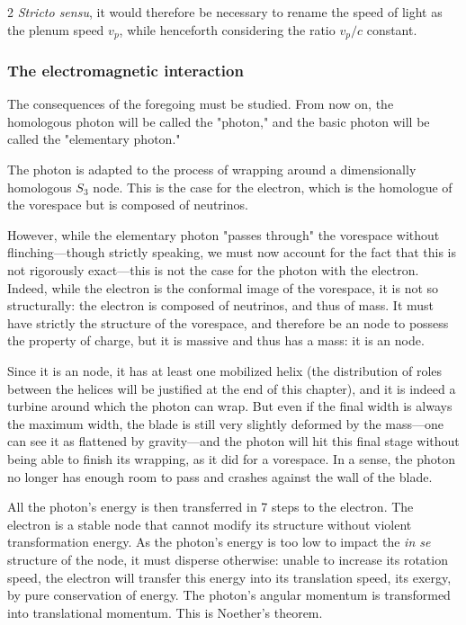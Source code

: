 \begin{multicols}{2}
	\textit{Stricto sensu}, it would therefore be necessary to rename the speed of light as the plenum speed $v_p$, while henceforth considering the ratio $v_p/c$ constant.
	
	\subsubsection{The electromagnetic interaction}
	
	The consequences of the foregoing must be studied. From now on, the homologous photon will be called the "photon," and the basic photon will be called the "elementary photon."
	
	The photon is adapted to the process of wrapping around a dimensionally homologous $S_3$ node. This is the case for the electron, which is the homologue of the vorespace but is composed of neutrinos.
	
	However, while the elementary photon "passes through" the vorespace without flinching—though strictly speaking, we must now account for the fact that this is not rigorously exact—this is not the case for the photon with the electron. Indeed, while the electron is the conformal image of the vorespace, it is not so structurally: the electron is composed of neutrinos, and thus of mass. It must have strictly the structure of the vorespace, and therefore be an  node to possess the property of charge, but it is massive and thus has a mass: it is an  node.
	
	Since it is an  node, it has at least one mobilized helix (the distribution of roles between the helices will be justified at the end of this chapter), and it is indeed a turbine around which the photon can wrap. But even if the final width is always the maximum width, the blade is still very slightly deformed by the mass—one can see it as flattened by gravity—and the photon will hit this final stage without being able to finish its wrapping, as it did for a vorespace. In a sense, the photon no longer has enough room to pass and crashes against the wall of the blade.
	
	All the photon's energy is then transferred in 7 steps to the electron. The electron is a stable node that cannot modify its structure without violent transformation energy. As the photon's energy is too low to impact the \textit{in se} structure of the node, it must disperse otherwise: unable to increase its rotation speed, the electron will transfer this energy into its translation speed, its exergy, by pure conservation of energy. The photon's angular momentum is transformed into translational momentum. This is Noether's theorem.
	

\end{multicols}
